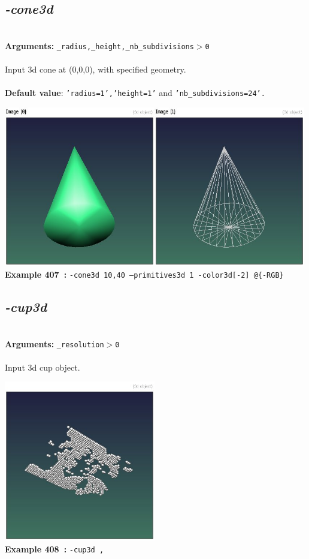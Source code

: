\documentclass[a4paper,11pt,twoside]{book}
\begin{document}
\subsection{\emph{-cone3d} }\vspace*{-0.5em}
~\\\textbf{Arguments: } 
{\small \texttt{\_radius,\_height,\_nb\_subdivisions$>$0}}\\~\\
Input 3d cone at (0,0,0), with specified geometry.
~\\~\\\textbf{Default value}: {\small \texttt{'radius=1','height=1'} and \texttt{'nb\_subdivisions=24'.}}
\begin{center}\includegraphics[keepaspectratio=true,height=7cm,width=\textwidth]{img/gmic_def407.jpg}\\
{\footnotesize \textbf{Example 407~:} \texttt{-cone3d 10,40 --primitives3d 1 -color3d[-2] @\{-RGB\}}}
\end{center}

\subsection{\emph{-cup3d} }\vspace*{-0.5em}
~\\\textbf{Arguments: } 
{\small \texttt{\_resolution$>$0}}\\~\\
Input 3d cup object.
\begin{center}\includegraphics[keepaspectratio=true,height=7cm,width=\textwidth]{img/gmic_def408.jpg}\\
{\footnotesize \textbf{Example 408~:} \texttt{-cup3d ,}}
\end{center}
\end{document}
